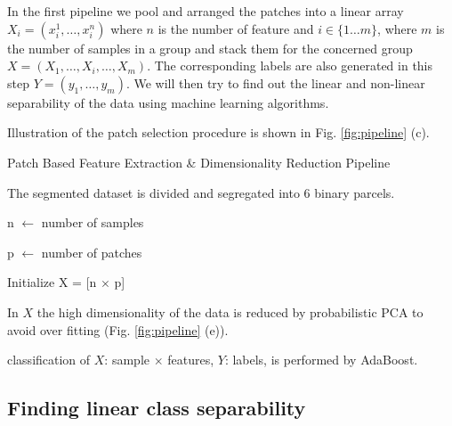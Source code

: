 In the first pipeline we pool and arranged the patches into a linear array $ X_i = (x^1_i,\dots,x^n_i) $ where $ n $ is the number of feature and $ i \in \{1 \dots m\} $, where $ m $ is the number of samples in a group and stack them for the concerned group $ X = (X_1,\dots,X_i,\dots,X_m) $. The corresponding labels are also generated in this step $ Y = (y_1,\dots,y_m) $. We will then try to find out the linear and non-linear separability of the data using machine learning algorithms.

Illustration of the patch selection procedure is shown in Fig. \ref{fig:pipeline} (c).

\begin{algorithm}
	\vspace{1em}
	\caption{Patch Based Feature Extraction \& Dimensionality Reduction Pipeline}\label{alg:pipeline2}
	
	
	
	The segmented dataset is divided and segregated into 6 binary parcels.
	
	 {
		
		n $ \gets $ number of samples
		
		p $ \gets $ number of patches
		
		Initialize X = [n $ \times $ p]
		
		
		In $ X $ the high dimensionality of the data is reduced by probabilistic PCA to avoid over fitting (Fig. \ref{fig:pipeline} (e)).
		
		classification of $ X $: sample $ \times $ features, $ Y $: labels, is performed by AdaBoost. 
	}
\end{algorithm}


\subsection{Finding linear class separability}
\label{sec:dicsriminant_analysis}


